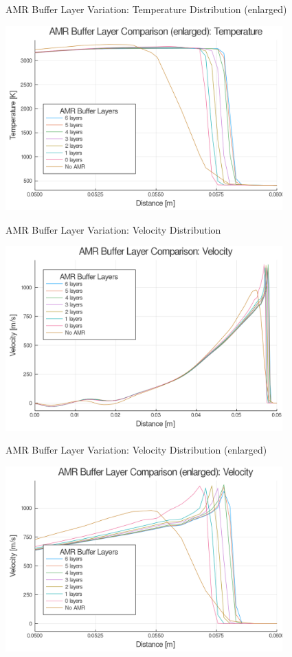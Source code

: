 \begin{frame}{AMR Buffer Layer Variation: Temperature Distribution (enlarged)}
\begin{center}
\includegraphics[width=0.8\textwidth]{../figs/amrfigs/amr_bufflayers/te.png}
\end{center}
\end{frame}

\begin{frame}{AMR Buffer Layer Variation: Velocity Distribution}
\begin{center}
\includegraphics[width=0.8\textwidth]{../figs/amrfigs/amr_bufflayers/u.png}
\end{center}
\end{frame}

\begin{frame}{AMR Buffer Layer Variation: Velocity Distribution (enlarged)}
\begin{center}
\includegraphics[width=0.8\textwidth]{../figs/amrfigs/amr_bufflayers/ue.png}
\end{center}
\end{frame}

